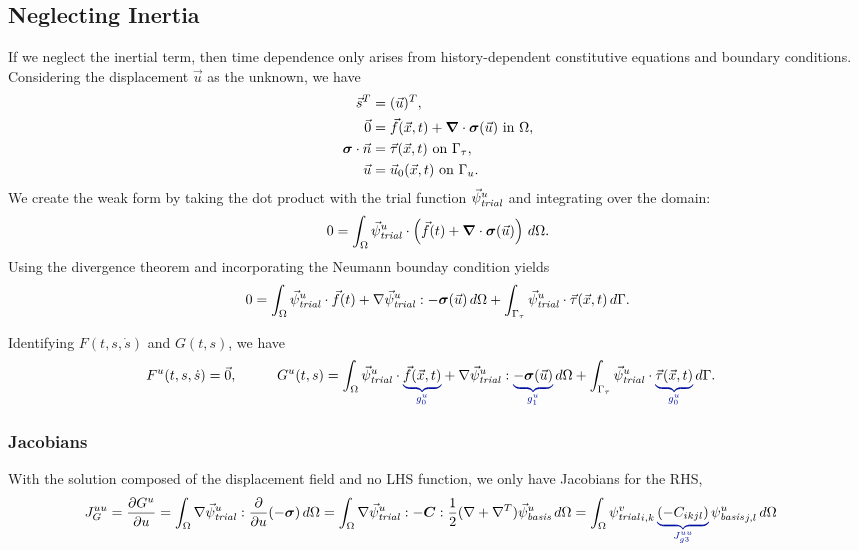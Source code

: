 \subsection{Neglecting Inertia}

If we neglect the inertial term, then time dependence only arises
from history-dependent constitutive equations and boundary
conditions. Considering the displacement $\vec{u}$ as the unknown, we
have
\begin{align}
  \vec{s}^T &= (\vec{u})^T, \\
%
  \vec{0} &= \vec{f}(\vec{x},t) + \tensor{\nabla} \cdot \tensor{\sigma}(\vec{u}) \text{ in }
\Omega, \\
  \tensor{\sigma} \cdot \vec{n} &= \vec{\tau}(\vec{x},t) \text{ on
                                  }\Gamma_{\tau}, \\
  \vec{u} &= \vec{u}_0(\vec{x},t) \text{ on }\Gamma_u.
\end{align}
We create the weak form by taking the dot product with the trial
function $\trialvec[u]$ and integrating over the domain:
\begin{equation}
  0 = \int_\Omega \trialvec[u] \cdot \left( \vec{f}(t) + \tensor{\nabla} \cdot \tensor{\sigma}
(\vec{u})  \right) 
\, d\Omega.
\end{equation}
Using the divergence theorem and incorporating the Neumann bounday
condition yields
\begin{equation}
  0 = \int_\Omega \trialvec[u] \cdot \vec{f}(t) + \nabla \trialvec[u] : -\tensor{\sigma}
(\vec{u}) \, d\Omega + 
\int_{\Gamma_\tau} \trialvec[u] \cdot \vec{\tau}(\vec{x},t) \, d\Gamma.
\end{equation}

Identifying $F(t,s,\dot{s})$ and $G(t,s)$, we have
\begin{alignat}{2}
  F^u(t,s,\dot{s}) &= \vec{0},
  & \qquad
  G^u(t,s) &= \int_\Omega \trialvec[u] \cdot \eqnannotate{\vec{f}(\vec{x},t)}{g_0^u} + \nabla 
\trialvec[u] : 
\eqnannotate{-\tensor{\sigma}(\vec{u})}{g_1^u} \, d\Omega + \int_{\Gamma_\tau} \trialvec[u] 
\cdot 
\eqnannotate{\vec{\tau}(\vec{x},t)}{g_0^u} \, d\Gamma.
\end{alignat}


\subsubsection{Jacobians}

With the solution composed of the displacement field and no LHS function, we only have 
Jacobians for the RHS,
\begin{align}
  J_G^{uu} &= \frac{\partial G^u}{\partial u} = \int_\Omega \nabla \trialvec[u] : 
\frac{\partial}{\partial u}(-
\tensor{\sigma}) \, d\Omega 
  = \int_\Omega \nabla \trialvec[u] : -\tensor{C} : \frac{1}{2}(\nabla + \nabla^T)\basisvec[u] 
\, d\Omega 
  = \int_\Omega \trialscalar[v]_{i,k} \, \eqnannotate{\left( -C_{ikjl} \right)}{J_{g3}^{uu}}  
\, 
\basisscalar[u]_{j,l}\, d\Omega
\end{align}

